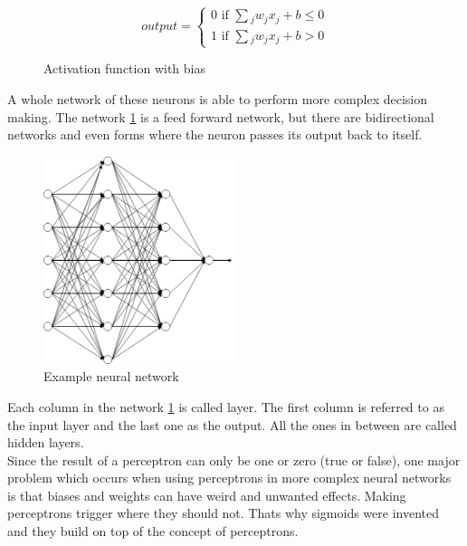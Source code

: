 \vspace{0.25cm}
\begin{figure}[H]
    \caption{Activation function with bias}
    \begin{equation*}
        output=
        \begin{cases}
            0 \text{ if } \sum{_j}{w_jx_j+b \le 0}\\
            1 \text{ if } \sum{_j}{w_jx_j+b > 0}
        \end{cases}
    \end{equation*}
\end{figure}
\vspace{0.25cm} \noindent
A whole network of these neurons is able to perform more complex decision making. The network \ref{fig:neural-network} is a feed forward network, but there are
bidirectional networks and even forms where the neuron passes its output back to itself. 
\vspace{0.25cm}
\begin{figure}[H]
    \caption{Example neural network}
    \begin{center}
        \includegraphics[width=0.5\textwidth]{images/neurons/neural_network.png}
    \end{center}
    \label{fig:neural-network}
\end{figure}
\vspace{0.25cm} \noindent
Each column in the network \ref{fig:neural-network} is called layer. The first column is referred to as the input layer and the last one as the output. All the
ones in between are called hidden layers. \\
Since the result of a perceptron can only be one or zero (true or false), one major problem which occurs when using perceptrons in more
complex neural networks is that biases and weights can have weird and unwanted effects. Making perceptrons trigger where they should not.
Thats why sigmoids were invented and they build on top of the concept of perceptrons.

